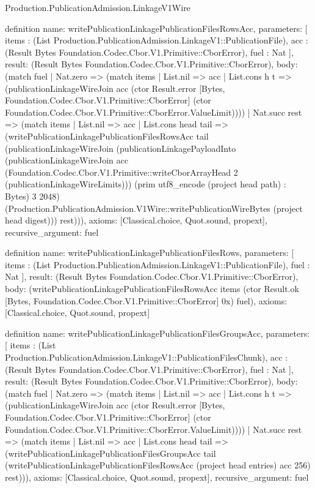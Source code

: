\begin{lexlean}{Production.PublicationAdmission.LinkageV1Wire}
\begin{semanticmodule}
definition{
  name: writePublicationLinkagePublicationFilesRowsAcc,
  parameters: [
    items : (List Production.PublicationAdmission.LinkageV1::PublicationFile),
    acc : (Result Bytes Foundation.Codec.Cbor.V1.Primitive::CborError),
    fuel : Nat
  ],
  result: (Result Bytes Foundation.Codec.Cbor.V1.Primitive::CborError),
  body: (match fuel
    | Nat.zero => (match items
      | List.nil => acc
      | List.cons h t => (publicationLinkageWireJoin acc (ctor Result.error [Bytes, Foundation.Codec.Cbor.V1.Primitive::CborError] (ctor Foundation.Codec.Cbor.V1.Primitive::CborError.ValueLimit))))
    | Nat.succ rest => (match items
      | List.nil => acc
      | List.cons head tail => (writePublicationLinkagePublicationFilesRowsAcc tail (publicationLinkageWireJoin (publicationLinkagePayloadInto (publicationLinkageWireJoin acc (Foundation.Codec.Cbor.V1.Primitive::writeCborArrayHead 2 (publicationLinkageWireLimits))) (prim utf8_encode (project head path) : Bytes) 3 2048) (Production.PublicationAdmission.V1Wire::writePublicationWireBytes (project head digest))) rest))),
  axioms: [Classical.choice, Quot.sound, propext],
  recursive_argument: fuel
}

definition{
  name: writePublicationLinkagePublicationFilesRows,
  parameters: [
    items : (List Production.PublicationAdmission.LinkageV1::PublicationFile),
    fuel : Nat
  ],
  result: (Result Bytes Foundation.Codec.Cbor.V1.Primitive::CborError),
  body: (writePublicationLinkagePublicationFilesRowsAcc items (ctor Result.ok [Bytes, Foundation.Codec.Cbor.V1.Primitive::CborError] 0x) fuel),
  axioms: [Classical.choice, Quot.sound, propext]
}

definition{
  name: writePublicationLinkagePublicationFilesGroupsAcc,
  parameters: [
    items : (List Production.PublicationAdmission.LinkageV1::PublicationFilesChunk),
    acc : (Result Bytes Foundation.Codec.Cbor.V1.Primitive::CborError),
    fuel : Nat
  ],
  result: (Result Bytes Foundation.Codec.Cbor.V1.Primitive::CborError),
  body: (match fuel
    | Nat.zero => (match items
      | List.nil => acc
      | List.cons h t => (publicationLinkageWireJoin acc (ctor Result.error [Bytes, Foundation.Codec.Cbor.V1.Primitive::CborError] (ctor Foundation.Codec.Cbor.V1.Primitive::CborError.ValueLimit))))
    | Nat.succ rest => (match items
      | List.nil => acc
      | List.cons head tail => (writePublicationLinkagePublicationFilesGroupsAcc tail (writePublicationLinkagePublicationFilesRowsAcc (project head entries) acc 256) rest))),
  axioms: [Classical.choice, Quot.sound, propext],
  recursive_argument: fuel
}


\end{semanticmodule}
\end{lexlean}
